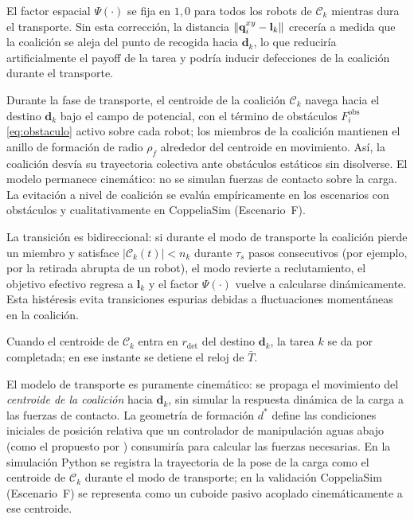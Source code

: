 El factor espacial $\Psi(\cdot)$ se fija en $1{,}0$ para todos los robots de
$\mathcal{C}_k$ mientras dura el transporte. Sin esta corrección, la
distancia $\left\|\mathbf{q}_i^{xy} - \mathbf{l}_k\right\|$ crecería a medida que la
coalición se aleja del punto de recogida hacia $\mathbf{d}_k$, lo que reduciría
artificialmente el payoff de la tarea y podría inducir defecciones de la
coalición durante el transporte.

Durante la fase de transporte, el centroide de la coalición $\mathcal{C}_k$ navega
hacia el destino $\mathbf{d}_k$ bajo el campo de potencial, con el término de
obstáculos $F_i^{\mathrm{obs}}$ \eqref{eq:obstaculo} activo sobre cada robot; los
miembros de la coalición mantienen el anillo de formación de radio $\rho_f$ alrededor
del centroide en movimiento. Así, la coalición desvía su trayectoria
colectiva ante obstáculos estáticos sin disolverse. El modelo permanece
cinemático: no se simulan fuerzas de contacto sobre la carga. La evitación a nivel de
coalición se evalúa empíricamente en los escenarios con obstáculos y cualitativamente en
CoppeliaSim (Escenario~F).

La transición es bidireccional: si durante el modo de transporte la coalición
pierde un miembro y satisface $|\mathcal{C}_k(t)| < n_k$ durante $\tau_s$ pasos
consecutivos (por ejemplo, por la retirada abrupta de un robot), el modo revierte
a reclutamiento, el objetivo efectivo regresa a $\mathbf{l}_k$ y el factor
$\Psi(\cdot)$ vuelve a calcularse dinámicamente. Esta histéresis evita
transiciones espurias debidas a fluctuaciones momentáneas en la coalición.

Cuando el centroide de $\mathcal{C}_k$ entra en $r_{\mathrm{det}}$ del destino
$\mathbf{d}_k$, la tarea $k$ se da por completada; en ese instante se detiene el reloj
de $\bar{T}$.

\begin{observacion}
El modelo de transporte es puramente cinemático: se propaga el movimiento
del \emph{centroide de la coalición} hacia $\mathbf{d}_k$, sin simular la
respuesta dinámica de la carga a las fuerzas de contacto. La geometría de
formación $d^*$ define las condiciones iniciales de posición relativa
que un controlador de manipulación aguas abajo (como el propuesto por
\citealt{ebel2024cooperative}) consumiría para calcular las fuerzas necesarias.
En la simulación Python se registra la trayectoria de la pose de la carga como
el centroide de $\mathcal{C}_k$ durante el modo de transporte; en la validación
CoppeliaSim (Escenario~F) se representa como un cuboide pasivo acoplado
cinemáticamente a ese centroide.
\end{observacion}


